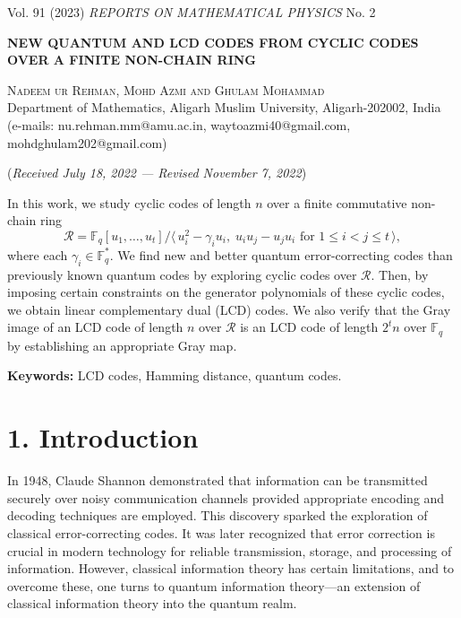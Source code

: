 \documentclass[12pt]{article}
\begin{document}
\begin{center}
Vol. 91 (2023) \quad \textit{REPORTS ON MATHEMATICAL PHYSICS} \quad No. 2
\end{center}

\begin{center}
\textbf{NEW QUANTUM AND LCD CODES FROM CYCLIC CODES} \\
\textbf{OVER A FINITE NON-CHAIN RING}
\end{center}

\begin{center}
\textsc{Nadeem ur Rehman, Mohd Azmi and Ghulam Mohammad} \\
Department of Mathematics, Aligarh Muslim University, Aligarh-202002, India \\
(e-mails: nu.rehman.mm@amu.ac.in, waytoazmi40@gmail.com, mohdghulam202@gmail.com)
\end{center}

\begin{center}
(\textit{Received July 18, 2022 --- Revised November 7, 2022})
\end{center}

In this work, we study cyclic codes of length $n$ over a finite commutative non-chain ring 
\[
\mathcal{R} = \mathbb{F}_q[u_1,\ldots,u_t] \Big/ \big\langle\, u_i^2 - \gamma_i u_i,\; u_i u_j - u_j u_i \text{ for } 1 \le i < j \le t\,\big\rangle,
\] 
where each $\gamma_i \in \mathbb{F}_q^*$. We find new and better quantum error-correcting codes than previously known quantum codes by exploring cyclic codes over $\mathcal{R}$. Then, by imposing certain constraints on the generator polynomials of these cyclic codes, we obtain linear complementary dual (LCD) codes. We also verify that the Gray image of an LCD code of length $n$ over $\mathcal{R}$ is an LCD code of length $2^t n$ over $\mathbb{F}_q$ by establishing an appropriate Gray map.

\textbf{Keywords:} LCD codes, Hamming distance, quantum codes.

\section*{1. Introduction}
In 1948, Claude Shannon \cite{shannon1948} demonstrated that information can be transmitted securely over noisy communication channels provided appropriate encoding and decoding techniques are employed. This discovery sparked the exploration of classical error-correcting codes. It was later recognized that error correction is crucial in modern technology for reliable transmission, storage, and processing of information. However, classical information theory has certain limitations, and to overcome these, one turns to quantum information theory---an extension of classical information theory into the quantum realm.
\end{document}
